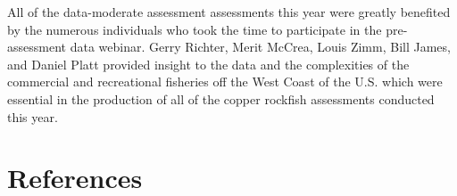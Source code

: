 \documentclass[11pt,
  english,
  a4paper,
]{article}
\begin{document}
\leavevmode\tagmcend\tagstructend\par


All of the data-moderate assessment assessments this year were greatly benefited by the numerous individuals who took the time to participate in the pre-assessment data webinar. Gerry Richter, Merit McCrea, Louis Zimm, Bill James, and Daniel Platt provided insight to the data and the complexities of the commercial and recreational fisheries off the West Coast of the U.S. which were essential in the production of all of the copper rockfish assessments conducted this year.

\leavevmode\tagmcend\tagstructend\par

\clearpage


\hypertarget{references}{%
\section{References}\label{references}}

\leavevmode\tagmcend\tagstructend

\end{document}
